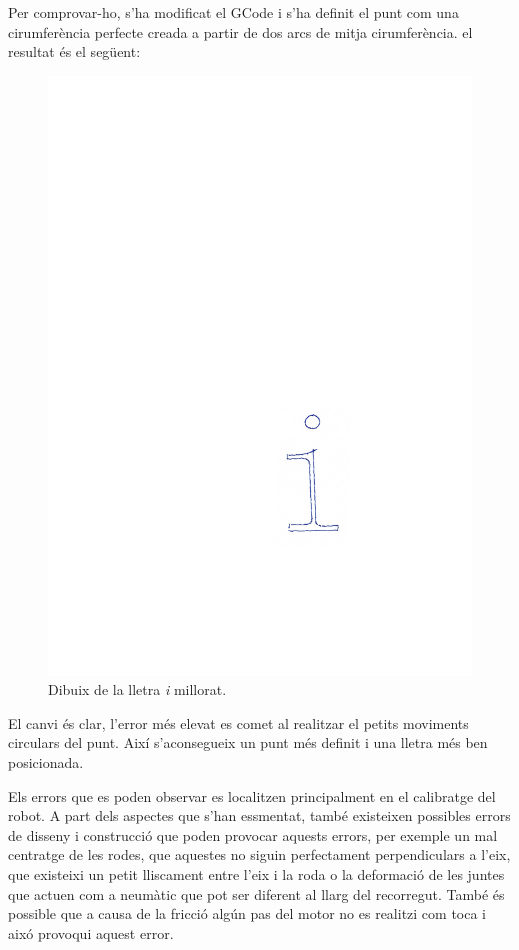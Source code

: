 \begin{itemize}
	Per comprovar-ho, s'ha modificat el GCode i s'ha definit el punt com una cirumferència perfecte creada a partir de dos arcs de mitja cirumferència. el resultat és el següent:
	\begin{figure}[H]
		\centering
		\includegraphics{resultatLletra2}
		\caption{Dibuix de la lletra \textit{i} millorat.}
		\label{fig:Lletra2}
	\end{figure}
	El canvi és clar, l'error més elevat es comet al realitzar el petits moviments circulars del punt. Així s'aconsegueix un punt més definit i una lletra més ben posicionada.
	
	Els errors que es poden observar es localitzen principalment en el calibratge del robot. A part dels aspectes que s'han essmentat, també existeixen possibles errors de disseny i construcció que poden provocar aquests errors, per exemple un mal centratge de les rodes, que aquestes no siguin perfectament perpendiculars a l'eix, que existeixi un petit lliscament entre l'eix i la roda o la deformació de les juntes que actuen com a neumàtic que pot ser diferent al llarg del recorregut. També és possible que a causa de la fricció algún pas del motor no es realitzi com toca i aixó provoqui aquest error.  
	

\end{itemize}
